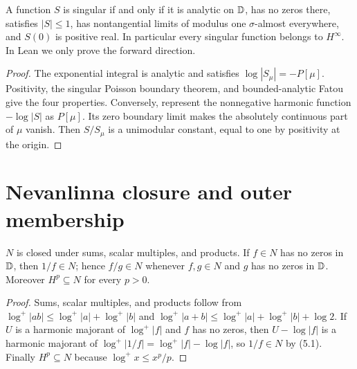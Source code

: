 \begin{theorem}
  \label{thm:singular_function_properties}
  \leanok
  A function $S$ is singular if and only if it is analytic on $\mathbb{D}$,
  has no zeros there, satisfies $|S|\le1$, has nontangential limits of
  modulus one $\sigma$-almost everywhere, and $S(0)$ is positive real. In
  particular every singular function belongs to $H^\infty$.
  In Lean we only prove the forward direction.
  \begin{proof}
    \leanok
    The exponential integral is analytic and satisfies
    $\log|S_\mu|=-P[\mu]$. Positivity, the singular Poisson boundary theorem,
    and bounded-analytic Fatou give the four properties.
    Conversely, represent the nonnegative harmonic function $-\log|S|$
    as $P[\mu]$. Its zero boundary limit makes the absolutely continuous
    part of $\mu$ vanish. Then $S/S_\mu$ is a unimodular constant,
    equal to one by positivity at the origin.
  \end{proof}
\end{theorem}

\section{Nevanlinna closure and outer membership}

\begin{theorem}
  \label{thm:nevanlinna_algebra}
  \leanok
  $N$ is closed under sums, scalar multiples, and products. If $f\in N$ has no
  zeros in $\mathbb{D}$, then $1/f\in N$; hence $f/g\in N$ whenever $f,g\in N$ and $g$
  has no zeros in $\mathbb{D}$. Moreover $H^p\subseteq N$ for every $p>0$.
  \begin{proof}
    \leanok
    Sums, scalar multiples, and products follow from
    $\log^+|ab|\le\log^+|a|+\log^+|b|$ and
    $\log^+|a+b|\le\log^+|a|+\log^+|b|+\log2$. If $U$ is a harmonic majorant
    of $\log^+|f|$ and $f$ has no zeros, then $U-\log|f|$ is a harmonic
    majorant of $\log^+|1/f|=\log^+|f|-\log|f|$, so $1/f\in N$ by (5.1).
    Finally $H^p\subseteq N$ because $\log^+x\le x^p/p$.
  \end{proof}
\end{theorem}

